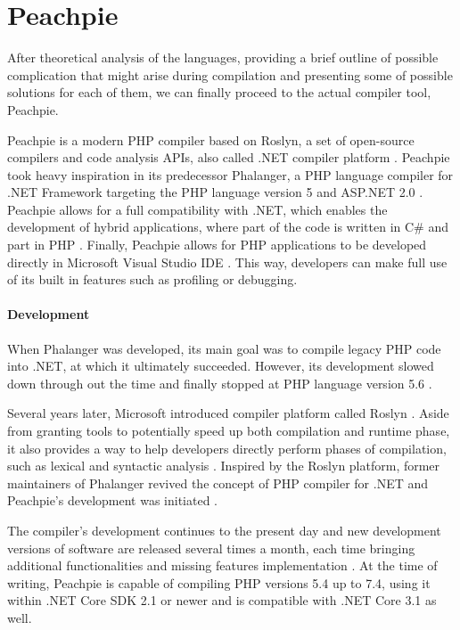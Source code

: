 \section{Peachpie}
After theoretical analysis of the languages, providing a brief outline of possible complication that might arise during compilation and presenting some of possible solutions for each of them, we can finally proceed to the actual compiler tool, Peachpie.

Peachpie is a modern PHP compiler based on Roslyn, a set of open-source compilers and code analysis APIs, also called .NET compiler platform \citep{Peachpie, microsoft.docs}. Peachpie took heavy inspiration in its predecessor Phalanger, a PHP language compiler for .NET Framework targeting the PHP language version 5 and ASP.NET 2.0 \citep{Peachpie, Phalanger}. Peachpie allows for a full compatibility with .NET, which enables the development of hybrid applications, where part of the code is written in C\# and part in PHP \citep{Peachpie}. Finally, Peachpie allows for PHP applications to be developed directly in Microsoft Visual Studio IDE \citep{Peachpie}. This way, developers can make full use of its built in features such as profiling or debugging.

\paragraph{Development}
When Phalanger was developed, its main goal was to compile legacy PHP code into .NET, at which it ultimately succeeded. However, its development slowed down through out the time and finally stopped at PHP language version 5.6 \citep{Peachpie}. 

Several years later, Microsoft introduced compiler platform called Roslyn \citep{Peachpie}. Aside from granting tools to potentially speed up both compilation and runtime phase, it also provides a way to help developers directly perform phases of compilation, such as lexical and syntactic analysis \citep{Peachpie}. Inspired by the Roslyn platform, former maintainers of Phalanger revived the concept of PHP compiler for .NET and Peachpie's development was initiated \citep{Peachpie}. 

The compiler's development continues to the present day and new development versions of software are released several times a month, each time bringing additional functionalities and missing features implementation \citep{peachpie.github}. At the time of writing, Peachpie is capable of compiling PHP versions 5.4 up to 7.4, using it within .NET Core SDK 2.1 or newer and is compatible with .NET Core 3.1 as well\citep{Peachpie, peachpie.github}.


